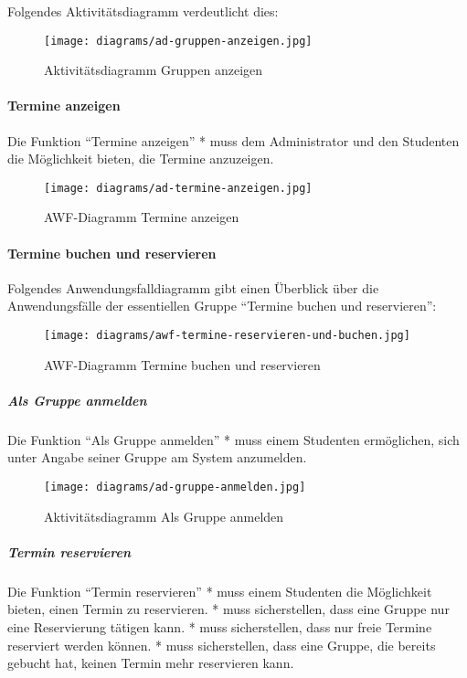 \documentclass[]{article}
\let\oldparagraph\paragraph
\renewcommand{\paragraph}[1]{\oldparagraph{#1}\mbox{}}
\let\oldsubparagraph\subparagraph
\renewcommand{\subparagraph}[1]{\oldsubparagraph{#1}\mbox{}}
\begin{document}
Folgendes Aktivitätsdiagramm verdeutlicht dies:

\begin{figure}
\centering
\texttt{[image: diagrams/ad-gruppen-anzeigen.jpg]}
\caption{Aktivitätsdiagramm Gruppen anzeigen}
\end{figure}

\hypertarget{termine-anzeigen}{%
\paragraph{Termine anzeigen}\label{termine-anzeigen}}

Die Funktion ``Termine anzeigen'' * muss dem Administrator und den
Studenten die Möglichkeit bieten, die Termine anzuzeigen.

\begin{figure}
\centering
\texttt{[image: diagrams/ad-termine-anzeigen.jpg]}
\caption{AWF-Diagramm Termine anzeigen}
\end{figure}

\hypertarget{termine-buchen-und-reservieren}{%
\paragraph{Termine buchen und
reservieren}\label{termine-buchen-und-reservieren}}

Folgendes Anwendungsfalldiagramm gibt einen Überblick über die
Anwendungsfälle der essentiellen Gruppe ``Termine buchen und
reservieren'':

\begin{figure}
\centering
\texttt{[image: diagrams/awf-termine-reservieren-und-buchen.jpg]}
\caption{AWF-Diagramm Termine buchen und reservieren}
\end{figure}

\hypertarget{als-gruppe-anmelden}{%
\subparagraph{Als Gruppe anmelden}\label{als-gruppe-anmelden}}

Die Funktion ``Als Gruppe anmelden'' * muss einem Studenten ermöglichen,
sich unter Angabe seiner Gruppe am System anzumelden.

\begin{figure}
\centering
\texttt{[image: diagrams/ad-gruppe-anmelden.jpg]}
\caption{Aktivitätsdiagramm Als Gruppe anmelden}
\end{figure}

\hypertarget{termin-reservieren}{%
\subparagraph{Termin reservieren}\label{termin-reservieren}}

Die Funktion ``Termin reservieren'' * muss einem Studenten die
Möglichkeit bieten, einen Termin zu reservieren. * muss sicherstellen,
dass eine Gruppe nur eine Reservierung tätigen kann. * muss
sicherstellen, dass nur freie Termine reserviert werden können. * muss
sicherstellen, dass eine Gruppe, die bereits gebucht hat, keinen Termin
mehr reservieren kann.
\end{document}
